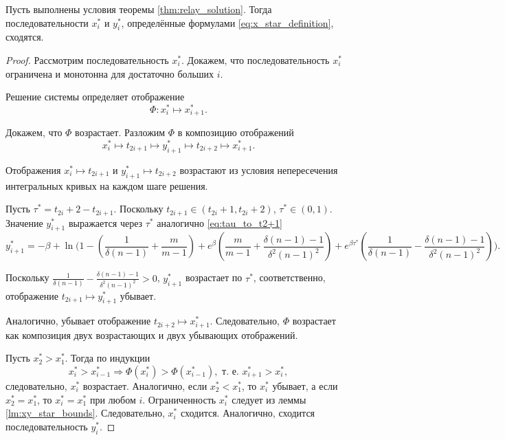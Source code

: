 \begin{lemma}
	\label{lm:convergence_x_star}
	Пусть выполнены условия теоремы \ref{thm:relay_solution}. Тогда последовательности $x^*_i$ и $y^*_i$, определённые формулами \eqref{eq:x_star_definition}, сходятся.
\end{lemma}
\begin{proof}
	
	Рассмотрим последовательность $x^*_i$. Докажем, что последовательность $x^*_i$ ограничена и монотонна для достаточно больших $i$.
	
	Решение системы определяет отображение
	\begin{equation}
		\label{eq:flow_relay}
		\Phi: x^*_i \mapsto x^*_{i + 1}.
	\end{equation}
	
	Докажем, что $\Phi$ возрастает. Разложим $\Phi$ в композицию отображений
	\begin{equation}
		x^*_i \mapsto t_{2i + 1} \mapsto y^*_{i + 1} \mapsto t_{2i + 2} \mapsto x^*_{i + 1}.
	\end{equation}
	
	Отображения $x^*_i \mapsto t_{2i + 1}$ и $y^*_{i + 1} \mapsto t_{2i + 2}$ возрастают из условия непересечения интегральных кривых на каждом шаге решения.
	
	Пусть $\tau^* = t_{2i} + 2 - t_{2i + 1} $. Поскольку $t_{2i + 1} \in (t_{2i} + 1, t_{2i} + 2)$, $\tau^* \in (0, 1)$. Значение $y^*_{i + 1}$ выражается через $\tau^*$ аналогично \eqref{eq:tau_to_t2+1}
	\footnotesize
	\[
	y^*_{i + 1} = -\beta + \ln\Bigg( 1 - \left(\frac{1}{\delta(n - 1)} + \frac{m}{m - 1}\right) +  e^{\beta} \left(\frac{m}{m - 1} + \frac{\delta(n - 1) - 1}{\delta^2 (n - 1)^2}\right) + e^{\beta \tau^*} \left(\frac{1}{\delta(n - 1)} - \frac{\delta(n - 1) - 1}{\delta^2 (n - 1)^2}\right) \Bigg).
	\]
	\normalsize
	
	Поскольку $\frac{1}{\delta(n - 1)} - \frac{\delta(n - 1) - 1}{\delta^2 (n - 1)^2} > 0$, $y^*_{i + 1}$ возрастает по $\tau^*$, соответственно, отображение $t_{2i + 1} \mapsto y^*_{i + 1}$ убывает.
	
	Аналогично, убывает отображение $t_{2i + 2} \mapsto x^*_{i + 1}$. Следовательно, $\Phi$ возрастает как композиция двух возрастающих и двух убывающих отображений.
	
	Пусть $x^*_2 > x^*_1$. Тогда по индукции
	\[
	x^*_{i} > x^*_{i - 1} \Rightarrow \Phi(x^*_i) > \Phi(x^*_{i - 1}), \text{ т.~е. } x^*_{i + 1} > x^*_{i},
	\]
	следовательно, $x^*_i$ возрастает. Аналогично, если $x^*_2 < x^*_1$, то $x^*_i$ убывает, а если $x^*_2 = x^*_1$, то $x^*_i = x^*_1$ при любом $i$. Ограниченность $x^*_i$ следует из леммы \ref{lm:xy_star_bounds}. Следовательно, $x^*_i$ сходится. Аналогично, сходится последовательность $y^*_i$.
\end{proof}



